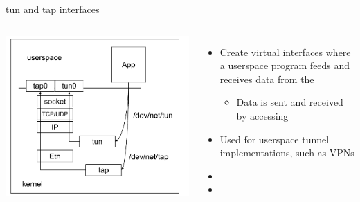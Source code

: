 \begin{frame}{tun and tap interfaces}
	\begin{columns}
	\includegraphics[width=\textwidth]{slides/networking-stack-netdevice/tuntap.pdf}
	\begin{itemize}
		\item Create virtual interfaces where a userspace program feeds and receives data from the 
			\begin{itemize}
				\item Data is sent and received by accessing 
			\end{itemize}
		\item Used for userspace tunnel implementations, such as VPNs
		\item {}
		\item {}

	\end{itemize}
	\end{columns}
\end{frame}

